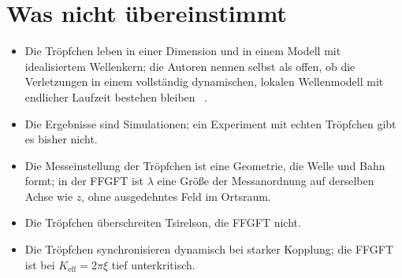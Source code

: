 \section{Was nicht übereinstimmt}

\begin{itemize}[leftmargin=2em,itemsep=3pt,topsep=3pt]
  \item Die Tröpfchen leben in einer Dimension und in einem Modell mit idealisiertem Wellenkern;
        die Autoren nennen selbst als offen, ob die Verletzungen in einem vollständig dynamischen,
        lokalen Wellenmodell mit endlicher Laufzeit bestehen bleiben \QM~\cite{Lopez2026}.
  \item Die Ergebnisse sind Simulationen; ein Experiment mit echten Tröpfchen gibt es bisher nicht.
  \item Die Messeinstellung der Tröpfchen ist eine Geometrie, die Welle und Bahn formt; in der FFGFT
        ist $\lambda$ eine Größe der Messanordnung auf derselben Achse wie $z$, ohne ausgedehntes Feld
        im Ortsraum.
  \item Die Tröpfchen überschreiten Tsirelson, die FFGFT nicht.
  \item Die Tröpfchen synchronisieren dynamisch bei starker Kopplung; die FFGFT ist bei
        $K_{\mathrm{eff}}=2\pi\xi$ tief unterkritisch.
\end{itemize}


